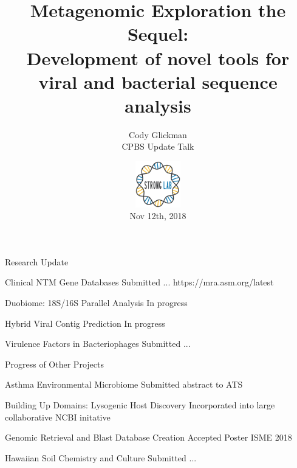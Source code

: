 \documentclass[11pt, xcolor=table]{beamer}
\author{Cody Glickman  \\ CPBS Update Talk}
\title{Metagenomic Exploration the Sequel: \\ Development of novel tools for viral and bacterial sequence analysis}
\date{ \includegraphics[height=2cm, width=2cm]{lablogo.png} \\ Nov 12th, 2018}
\begin{document}
	\maketitle
	\begin{frame}{Research Update}
	\begin{block}{\alert{Clinical NTM Gene Databases}}
	Submitted ...
	https://mra.asm.org/latest 
	\end{block}
	
	\begin{block}{\alert{Duobiome: 18S/16S Parallel Analysis}}
	In progress
	\end{block}
	
	\begin{block}{\alert{Hybrid Viral Contig Prediction}}
	In progress
	\end{block}
	
	\begin{block}{\alert{Virulence Factors in Bacteriophages}}
	Submitted ...
	\end{block}
	\end{frame}
	
	\begin{frame}{Progress of Other Projects}
	\begin{block}{Asthma Environmental Microbiome}
	Submitted abstract to ATS
	\end{block}
	
	\begin{block}{Building Up Domains: Lysogenic Host Discovery}
	Incorporated into large collaborative NCBI initative
	\end{block}
	
	\begin{block}{Genomic Retrieval and Blast Database Creation}
	Accepted Poster ISME 2018
	\end{block}
	
	\begin{block}{Hawaiian Soil Chemistry and Culture}
	Submitted ...
	\end{block}
	

	\end{frame}
\section{}
\end{document}
